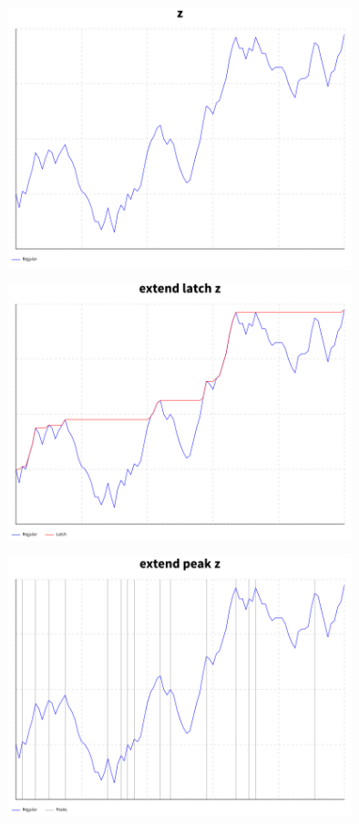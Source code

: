 \documentclass{beamer}
\begin{document}
\begin{frame}[fragile]
\begin{overprint}
    \begin{center}
    \includegraphics[width=0.75\textwidth]{graph1.png}
    \end{center}
    \begin{center}
    \includegraphics[width=0.75\textwidth]{graph2.png}
    \end{center}
    \begin{center}
    \includegraphics[width=0.75\textwidth]{graph3.png}

\end{center}
\end{overprint}
\end{frame}
\end{document}
